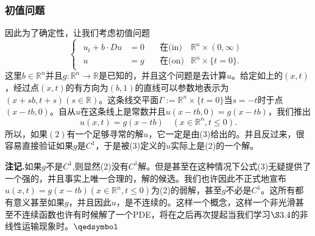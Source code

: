 \documentclass[leqno]{article}
\numberwithin{equation}{subsection}%
\begin{document}
\subsubsection{初值问题}
因此为了确定性，让我们考虑初值问题
\begin{equation}
\begin{cases}
\begin{aligned}
u_{t}+b\cdot Du&=0\quad&\text{在(in)}&\mathbb{R}^{n}\times(0,\infty)\\
u&=g\quad&\text{在(on)}&\mathbb{R}^{n}\times\{t=0\}.
\end{aligned}
\end{cases}
\end{equation}
这里$b\in\mathbb{R}^{n}$并且$g:\mathbb{R}^{n}\rightarrow\mathbb{R}$是已知的，并且这个问题是去计算$u$。给定如上的$(x,t)$，经过点$(x,t)$的有方向为$(b,1)$的直线可以参数地表示为$(x+sb,t+s)(s\in\mathbb{R})$。这条线交平面$\Gamma:=\mathbb{R}^{n}\times\{t=0\}$当$s=-t$时于点$(x-tb,0)$。自从$u$在这条线上是常数并且$u(x-tb,0)=g(x-tb)$，我们推出
\begin{equation}
u(x,t)=g(x-tb)\quad(x\in\mathbb{R}^{n},t\leq 0).
\end{equation}
所以，如果$(2)$有一个足够寻常的解$u$，它一定是由(3)给出的。并且反过来，很容易直接验证如果$g$是$C^{1}$，于是被(3)定义的$u$实际上是(2)的一个解。
\par
\noindent\textbf{注记.}如果$g$不是$C^{1}$,则显然(2)没有$C^{1}$解。但是甚至在这种情况下公式(3)无疑提供了一个强的，并且事实上唯一合理的，解的候选。我们也许因此不正式地宣布$u(x,t)=g(x-tb)(x\in\mathbb{R}^{n},t\leq 0)$为(2)的弱解，甚至$g$不必是$C^{1}$。这所有都有意义甚至如果$g$，并且因此$u$，是不连续的。这样一个概念，这样一个非光滑甚至不连续函数也许有时候解了一个PDE，将在之后再次提起当我们学习$\S 3.4$的非线性运输现象时。$\hfill\qedsymbol$
\end{document}
